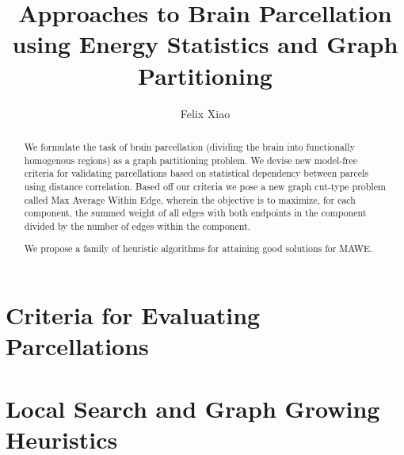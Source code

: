\documentclass{report}
\title{Approaches to Brain Parcellation using Energy Statistics and Graph Partitioning}
\author{Felix Xiao}
\begin{document}
\maketitle
\tableofcontents

\begin{abstract}
We formulate the task of brain parcellation (dividing the
brain into functionally homogenous regions) as a graph
partitioning problem. We devise new model-free criteria
for validating parcellations based on statistical
dependency between parcels using distance correlation.
Based off our criteria we pose a new graph cut-type
problem called Max Average Within Edge, wherein the
objective is to maximize, for each component, the summed
weight of all edges with both endpoints in the component
divided by the number of edges within the component.

We propose a family of heuristic algorithms for attaining
good solutions for MAWE.
\end{abstract}

%

%

\chapter{Criteria for Evaluating Parcellations}


\chapter{Local Search and Graph Growing Heuristics}


%

%



\end{document}
